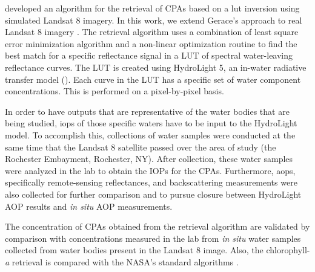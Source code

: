 \cite{Gerace:2013} developed an algorithm for the retrieval of CPAs based on a \acrfull{lut} inversion using simulated Landsat 8 imagery. In this work, we extend Gerace's approach to real Landsat 8 imagery \cite{Concha2013IGARSS}. The retrieval algorithm uses a combination of least square error minimization algorithm and a non-linear optimization routine to find the best match for a specific reflectance signal in a LUT of spectral water-leaving reflectance curves. The LUT is created using HydroLight 5, an in-water radiative transfer model (\cite{Mobley:2005}). Each curve in the LUT has a specific set of water component concentrations. This is performed on a pixel-by-pixel basis. 

In order to have outputs that are representative of the water bodies that are being studied, \acrfull{iops} of those specific waters have to be input to the HydroLight model. To accomplish this, collections of water samples were conducted at the same time that the Landsat 8 satellite passed over the area of study (the Rochester Embayment, Rochester, NY). After collection, these water samples were analyzed in the lab to obtain the IOPs for the CPAs. Furthermore, \acrfull{aops}, specifically remote-sensing reflectances, and backscattering measurements were also collected for further comparison and to pursue closure between HydroLight AOP results and {\it in situ} AOP measurements.

The concentration of CPAs obtained from the retrieval algorithm are validated by comparison with concentrations measured in the lab from {\it in situ} water samples collected from water bodies present in the Landsat 8 image. Also, the chlorophyll-{\it a} retrieval is compared with the NASA's standard algorithms \cite{OReilly1998_Chl,OReilly2000,Hu:2012fv}.